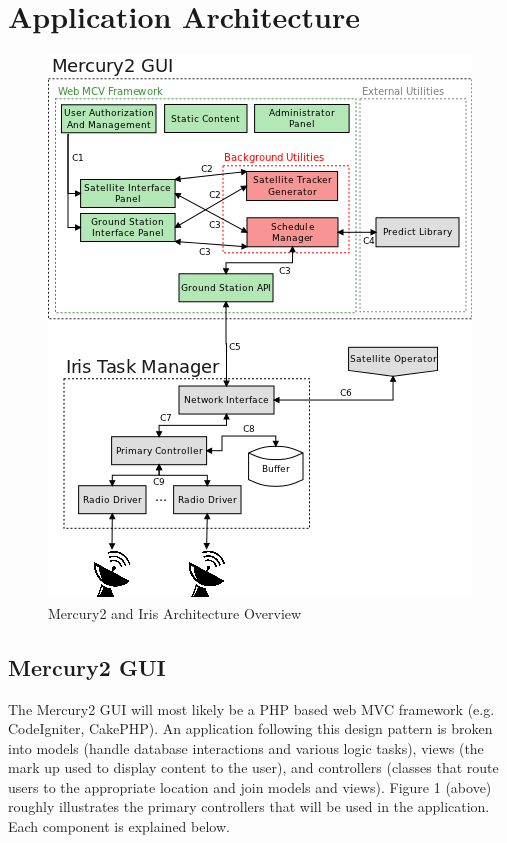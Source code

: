 \documentclass{mxl-note}
\begin{document}
\section{Application Architecture}
\begin{figure}[hbtp]
\centering
\includegraphics[scale=.65]{Architecture.png}
\caption{Mercury2 and Iris Architecture Overview}
\end{figure}

\subsection{Mercury2 GUI}
The Mercury2 GUI will most likely be a PHP based web MVC framework (e.g. CodeIgniter, CakePHP). An application following this design pattern is broken into models (handle database interactions and various logic tasks), views (the mark up used to display content to the user), and controllers (classes that route users to the appropriate location and join models and views). Figure 1 (above) roughly illustrates the primary controllers that will be used in the application. Each component is explained below. 
\end{document}
